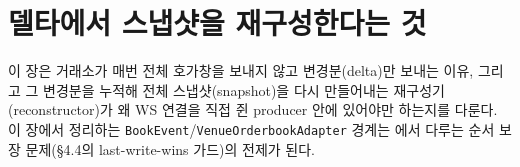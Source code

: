 \chapter{델타에서 스냅샷을 재구성한다는 것}
\label{ch:orderbook}

이 장은 거래소가 매번 전체 호가창을 보내지 않고 변경분(delta)만 보내는 이유, 그리고
그 변경분을 누적해 전체 스냅샷(snapshot)을 다시 만들어내는 재구성기(reconstructor)가
왜 WS 연결을 직접 쥔 producer 안에 있어야만 하는지를 다룬다. 이 장에서 정리하는
\texttt{BookEvent}/\texttt{VenueOrderbookAdapter} 경계는 에서
다루는 순서 보장 문제(§4.4의 last-write-wins 가드)의 전제가 된다.

